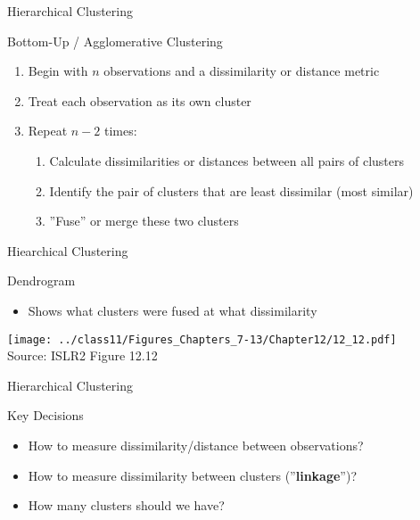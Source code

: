 \documentclass[ignorenonframetext,xcolor=x11names]{beamer}
\begin{document}
\begin{frame}{Hierarchical Clustering}
\begin{block}{Bottom-Up / Agglomerative Clustering}
\begin{enumerate}
   \item Begin with $n$ observations and a dissimilarity or distance metric
   \item Treat each observation as its own cluster
   \item Repeat $n-2$ times:
   \begin{enumerate}
      \normalsize
      \item Calculate dissimilarities or distances between all pairs of clusters
      \item Identify the pair of clusters that are least dissimilar (most similar)
      \item ''Fuse'' or merge these two clusters
   \end{enumerate}
\end{enumerate}
\end{block}
\end{frame}

\begin{frame}{Hiearchical Clustering}
\begin{block}{Dendrogram}
\begin{itemize}
  \item Shows what clusters were fused at what dissimilarity
\end{itemize}
\end{block}
\centering
\texttt{[image: ../class11/Figures\_Chapters\_7-13/Chapter12/12\_12.pdf]} \\

\scriptsize Source: ISLR2 Figure 12.12
\end{frame}

\begin{frame}{Hierarchical Clustering}
\begin{block}{Key Decisions}
\begin{itemize}
   \item How to measure dissimilarity/distance between observations?
   \item How to measure dissimilarity between clusters (''\textbf{linkage}'')?
   \item How many clusters should we have?
\end{itemize}
\end{block}
\end{frame}
\end{document}
